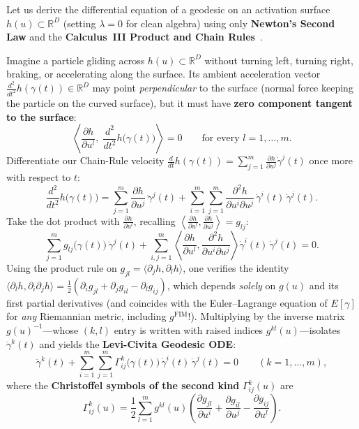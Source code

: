 \documentclass[11pt,a4paper]{article}
\newcommand{\R}{\mathbb{R}}
\theoremstyle{definition}
\begin{document}
Let us derive the differential equation of a geodesic on an activation surface $h(u) \subset \R^D$ (setting $\lambda = 0$ for clean algebra) using only \textbf{Newton's Second Law} and the \textbf{Calculus~III Product and Chain Rules}~\cite{morgan2016riemannian}.

Imagine a particle gliding across $h(u) \subset \R^D$ without turning left, turning right, braking, or accelerating along the surface. Its ambient acceleration vector $\frac{d^2}{dt^2}h(\gamma(t)) \in \R^D$ may point \emph{perpendicular} to the surface (normal force keeping the particle on the curved surface), but it must have \textbf{zero component tangent to the surface}:
\begin{equation}
    \left\langle \frac{\partial h}{\partial u^l},\; \frac{d^2}{dt^2} h\bigl(\gamma(t)\bigr) \right\rangle = 0 \qquad \text{for every } l = 1, \dots, m.
    \label{eq:zero-tangential-accel}
\end{equation}
Differentiate our Chain-Rule velocity $\frac{d}{dt}h(\gamma(t)) = \sum_{j=1}^m \frac{\partial h}{\partial u^j}\dot{\gamma}^j(t)$ once more with respect to $t$:
\[
    \frac{d^2}{dt^2} h\bigl(\gamma(t)\bigr)
    = \sum_{j=1}^m \frac{\partial h}{\partial u^j}\,\ddot{\gamma}^j(t)
    + \sum_{i=1}^m \sum_{j=1}^m \frac{\partial^2 h}{\partial u^i \partial u^j}\,\dot{\gamma}^i(t)\,\dot{\gamma}^j(t).
\]
Take the dot product with $\frac{\partial h}{\partial u^l}$, recalling $\left\langle \frac{\partial h}{\partial u^l}, \frac{\partial h}{\partial u^j} \right\rangle = g_{lj}$:
\[
    \sum_{j=1}^m g_{lj}\bigl(\gamma(t)\bigr)\,\ddot{\gamma}^j(t)
    + \sum_{i,j=1}^m \left\langle \frac{\partial h}{\partial u^l}, \frac{\partial^2 h}{\partial u^i \partial u^j} \right\rangle \dot{\gamma}^i(t)\,\dot{\gamma}^j(t) = 0.
\]
Using the product rule on $g_{jl} = \langle \partial_j h, \partial_l h \rangle$, one verifies the identity $\langle \partial_l h, \partial_i \partial_j h \rangle = \frac{1}{2}(\partial_i g_{jl} + \partial_j g_{il} - \partial_l g_{ij})$, which depends \emph{solely} on $g(u)$ and its first partial derivatives (and coincides with the Euler--Lagrange equation of $E[\gamma]$ for \emph{any} Riemannian metric, including $g^{\mathrm{FIM}}$!). Multiplying by the inverse matrix $g(u)^{-1}$---whose $(k,l)$ entry is written with raised indices $g^{kl}(u)$---isolates $\ddot{\gamma}^k(t)$ and yields the \textbf{Levi-Civita Geodesic ODE}:
\begin{equation}
    \ddot{\gamma}^k(t) + \sum_{i=1}^m \sum_{j=1}^m \Gamma^k_{ij}\bigl(\gamma(t)\bigr)\,\dot{\gamma}^i(t)\,\dot{\gamma}^j(t) = 0 \qquad (k = 1, \dots, m),
    \label{eq:geodesic-ode}
\end{equation}
where the \textbf{Christoffel symbols of the second kind} $\Gamma^k_{ij}(u)$ are
\begin{equation}
    \Gamma^k_{ij}(u) = \frac{1}{2}\sum_{l=1}^m g^{kl}(u)\!\left( \frac{\partial g_{jl}}{\partial u^i} + \frac{\partial g_{il}}{\partial u^j} - \frac{\partial g_{ij}}{\partial u^l} \right).
    \label{eq:christoffel}
\end{equation}
\end{document}
